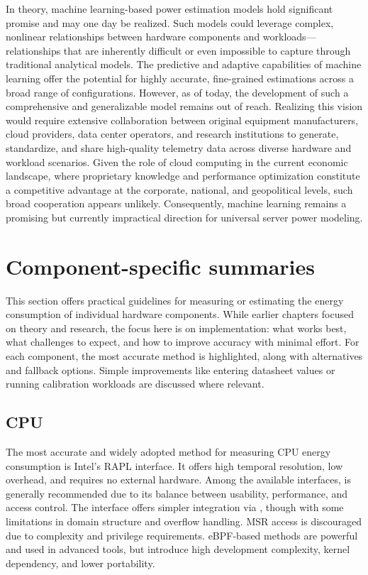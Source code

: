 In theory, machine learning-based power estimation models hold significant promise and may one day be realized. Such models could leverage complex, nonlinear relationships between hardware components and workloads—relationships that are inherently difficult or even impossible to capture through traditional analytical models. The predictive and adaptive capabilities of machine learning offer the potential for highly accurate, fine-grained estimations across a broad range of configurations. However, as of today, the development of such a comprehensive and generalizable model remains out of reach. Realizing this vision would require extensive collaboration between original equipment manufacturers, cloud providers, data center operators, and research institutions to generate, standardize, and share high-quality telemetry data across diverse hardware and workload scenarios. Given the role of cloud computing in the current economic landscape, where proprietary knowledge and performance optimization constitute a competitive advantage at the corporate, national, and geopolitical levels, such broad cooperation appears unlikely. Consequently, machine learning remains a promising but currently impractical direction for universal server power modeling.

\section{Component-specific summaries}
\label{sec:component_specific_summaries}

This section offers practical guidelines for measuring or estimating the energy consumption of individual hardware components. While earlier chapters focused on theory and research, the focus here is on implementation: what works best, what challenges to expect, and how to improve accuracy with minimal effort. For each component, the most accurate method is highlighted, along with alternatives and fallback options. Simple improvements like entering datasheet values or running calibration workloads are discussed where relevant.

\subsection{CPU}

The most accurate and widely adopted method for measuring CPU energy consumption is Intel's RAPL interface. It offers high temporal resolution, low overhead, and requires no external hardware. Among the available interfaces,  is generally recommended due to its balance between usability, performance, and access control. The  interface offers simpler integration via , though with some limitations in domain structure and overflow handling. MSR access is discouraged due to complexity and privilege requirements. eBPF-based methods are powerful and used in advanced tools, but introduce high development complexity, kernel dependency, and lower portability.

